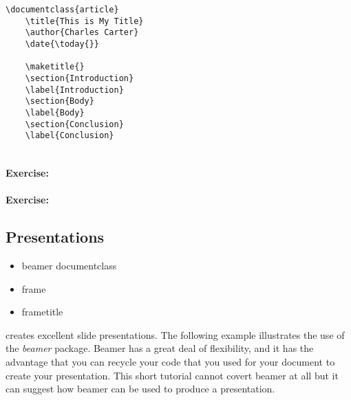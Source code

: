         \begin{verbatim}
\documentclass{article}
    \title{This is My Title}
    \author{Charles Carter}
    \date{\today{}}
 
    \maketitle{}
    \section{Introduction}
    \label{Introduction}
    \section{Body}
    \label{Body}
    \section{Conclusion}
    \label{Conclusion}
    
        \end{verbatim}

        \paragraph{Exercise:}

        \paragraph{Exercise:}


        \subsection{Presentations}
        \label{Presentations}
        
        \begin{framed}
            \begin{itemize}
                \item{beamer documentclass}
                \item{frame}
                \item{frametitle}
            \end{itemize}
        \end{framed}

        \Lx{} creates excellent slide presentations. The following example illustrates the use of the \textit{beamer} package. Beamer has a great deal of flexibility, and it has the advantage that you can recycle your \Lx{} code that you used for your document to create your presentation. This short tutorial cannot covert beamer at all but it can suggest how beamer can be used to produce a presentation. 


